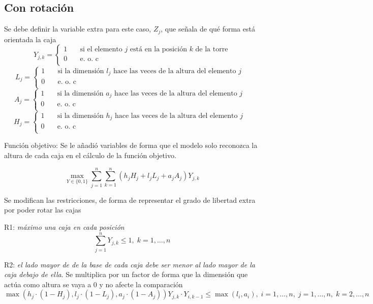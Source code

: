 \documentclass[letterpaper,10pt]{article}
\begin{document}
\subsection{Con rotación}

Se debe definir la variable extra para este caso, $Z_j$, que señala de qué forma está orientada la caja
\[
    Y_{j,k} =
         \begin{cases}
           1 &\quad\text{si el elemento $j$ está en la posición $k$ de la torre} \\
           0 &\quad\text{e. o. c } \\
         \end{cases}
\]
\[
    L_{j} =
         \begin{cases}
           1 &\quad\text{si la dimensión $l_j$ hace las veces de la altura del elemento $j$ } \\
           0 &\quad\text{e. o. c } \\
         \end{cases}
\]
\[
    A_{j} =
         \begin{cases}
           1 &\quad\text{si la dimensión $a_j$ hace las veces de la altura del elemento $j$ } \\
           0 &\quad\text{e. o. c } \\
         \end{cases}
\]
\[
    H_{j} =
         \begin{cases}
           1 &\quad\text{si la dimensión $h_j$ hace las veces de la altura del elemento $j$ } \\
           0 &\quad\text{e. o. c } \\
         \end{cases}
\]



Función objetivo: Se le añadió variables de forma que el modelo solo reconozca la altura de cada caja en el cálculo de la función objetivo.

$$\max_{Y \in \{0,1\}} \sum\limits_{j=1}^{n}\sum\limits_{k=1}^{n} (h_jH_j + l_jL_j + a_jA_j)Y_{j,k} $$



Se modifican las restricciones, de forma de representar el grado de libertad extra por poder rotar las cajas

R1: \textit{máximo una caja en cada posición}
$$\sum\limits_{j=1}^{n}Y_{j,k} \leq 1, \; k = 1, \ldots, n$$

R2: \textit{el lado mayor de de la base de cada caja debe ser menor al lado mayor de la caja debajo de ella}. Se multiplica por un factor de forma que la dimensión que actúa como altura se vaya a 0 y no afecte la comparación
 $$\max(h_j\cdot (1-H_j), l_j\cdot (1-L_j), a_j\cdot (1-A_j))Y_{j,k}\cdot Y_{i,k-1} \leq \max(l_i, a_i), \; i = 1, \ldots, n, \; j = 1, \ldots, n, \; k = 2, \ldots, n$$
\end{document}
